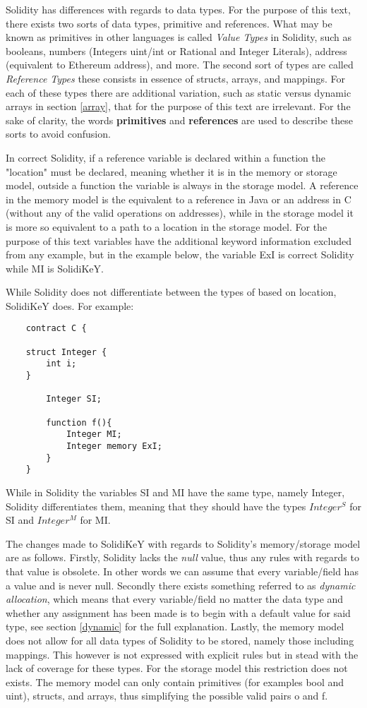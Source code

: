 \documentclass{article}
\begin{document}
	Solidity has differences with regards to data types. For the purpose of this text, there exists two sorts of data types, primitive and references. What may be known as primitives in other languages is called \textit{Value Types} in Solidity, such as booleans, numbers (Integers uint/int or Rational and Integer Literals), address (equivalent to Ethereum address), and more. The second sort of types are called \textit{Reference Types} these consists in essence of structs, arrays, and mappings. For each of these types there are additional variation, such as static versus dynamic arrays in section \ref{array}, that for the purpose of this text are irrelevant. For the sake of clarity, the words \textbf{primitives} and \textbf{references} are used to describe these sorts to avoid confusion. 
	
	In correct Solidity, if a reference variable is declared within a function the "location" must be declared, meaning whether it is in the memory or storage model, outside a function the variable is always in the storage model. A reference in the memory model is the equivalent to a reference in Java or an address in C (without any of the valid operations on addresses), while in the storage model it is more so equivalent to a path to a location in the storage model. For the purpose of this text variables have the additional keyword information excluded from any example, but in the example below, the variable ExI is correct Solidity while MI is SolidiKeY. 
	
	While Solidity does not differentiate between the types of based on location, SolidiKeY does. For example: 
	
	\begin{lstlisting}
	contract C {

	struct Integer {
		int i;
	}

    	Integer SI;
        
        function f(){
    		Integer MI;
      		Integer memory ExI;
    	}
    }
	\end{lstlisting}

	While in Solidity the variables SI and MI have the same type, namely Integer, Solidity differentiates them, meaning that they should have the types $Integer^S$ for SI and $Integer^M$ for MI. 
	
	The changes made to SolidiKeY with regards to Solidity's memory/storage model are as follows. Firstly, Solidity lacks the \textit{null} value, thus any rules with regards to that value is obsolete. In other words we can assume that every variable/field has a value and is never null. Secondly there exists something referred to as \textit{dynamic allocation}, which means that every variable/field no matter the data type and whether any assignment has been made is to begin with a default value for said type, see section \ref{dynamic} for the full explanation. Lastly, the memory model does not allow for all data types of Solidity to be stored, namely those including mappings. This however is not expressed with explicit rules but in stead with the lack of coverage for these types. For the storage model this restriction does not exists. The memory model can only contain primitives (for examples bool and uint), structs, and arrays, thus simplifying the possible valid pairs o and f.
	
\end{document}
